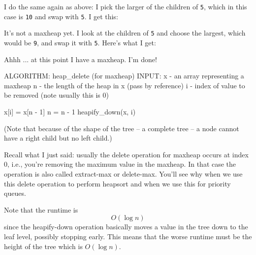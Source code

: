 I do the same again as above: I pick the larger of the children
of \texttt{5}, which in this case is \texttt{10} and swap with \texttt{5}.
I get this:



It's not a maxheap yet.
I look at the children of \texttt{5} and choose the largest,
which would be \texttt{9}, and swap it with \texttt{5}.
Here's what I get:



Ahhh ... at this point I have a maxheap.
I'm done!

\begin{console}[commandchars=\\\{\}]
  ALGORITHM: heap_delete (for maxheap)
  INPUT: x - an array representing a maxheap
  n - the length of the heap in x (pass by reference)
  i - index of value to be removed (note usually
  this is 0)

  x[i] = x[n - 1]
  n = n - 1
  heapify_down(x, i)
\end{console}

(Note that because of the shape of the tree -- a complete tree --
a node cannot have a right child but no left child.)

Recall what I just said: usually the delete operation for maxheap
occurs at index 0, i.e., you're removing the maximum value in the maxheap.
In that case the operation is also called extract-max or delete-max.
You'll see why when we use this delete operation to perform heapsort
and when we use this for priority queues.

Note that the runtime is
\[
  O(\log n)
\]
since the heapify-down operation basically moves
a value in the tree down to the leaf level, possibly stopping
early.
This means that the worse runtime must be
the height of the tree which is $O(\log n)$.








%


%
%
%
